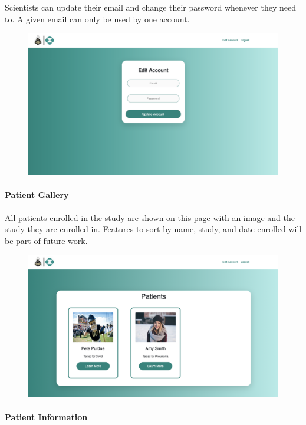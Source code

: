 \documentclass[]{book}
\let\oldparagraph\paragraph
\renewcommand{\paragraph}[1]{\oldparagraph{#1}\mbox{}}
\begin{document}
Scientists can update their email and change their password whenever
they need to. A given email can only be used by one account.

\begin{figure}
\centering
\includegraphics{images/Edit_Account.png}
\caption{}
\end{figure}

\paragraph{Patient Gallery}\label{patient-gallery}

All patients enrolled in the study are shown on this page with an image
and the study they are enrolled in. Features to sort by name, study, and
date enrolled will be part of future work.

\begin{figure}
\centering
\includegraphics{images/Patients_gallery_page.png}
\caption{}
\end{figure}

\paragraph{Patient Information}\label{patient-information}
\end{document}
